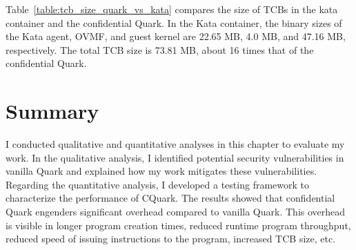 Table~\ref{table:tcb_size_quark_vs_kata} compares the size of TCBs in the kata container and the confidential Quark. In the Kata container, the binary sizes of the Kata agent, OVMF, and guest kernel are 22.65 MB, 4.0 MB, and 47.16 MB, respectively. The total TCB size is 73.81 MB, about 16 times that of the confidential 
Quark.

\section{Summary}
I conducted qualitative and quantitative analyses in this chapter to evaluate my work. In the qualitative analysis, I identified potential security vulnerabilities in vanilla Quark and explained how my work mitigates these vulnerabilities. 
Regarding the quantitative analysis, I developed a testing framework to characterize the performance of CQuark. The results showed that confidential Quark engenders significant overhead compared to vanilla Quark. 
This overhead is visible in longer program creation times, reduced runtime program throughput, reduced speed of issuing instructions to the program, increased \acrshort{TCB} size, etc.









\cleardoublepage

